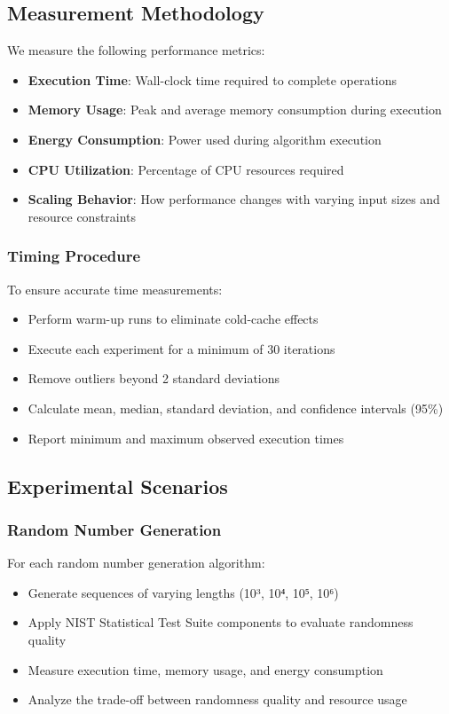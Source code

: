 \subsection{Measurement Methodology}
We measure the following performance metrics:
\begin{itemize}
    \item \textbf{Execution Time}: Wall-clock time required to complete operations
    \item \textbf{Memory Usage}: Peak and average memory consumption during execution
    \item \textbf{Energy Consumption}: Power used during algorithm execution
    \item \textbf{CPU Utilization}: Percentage of CPU resources required
    \item \textbf{Scaling Behavior}: How performance changes with varying input sizes and resource constraints
\end{itemize}

\subsubsection{Timing Procedure}
To ensure accurate time measurements:
\begin{itemize}
    \item Perform warm-up runs to eliminate cold-cache effects
    \item Execute each experiment for a minimum of 30 iterations
    \item Remove outliers beyond 2 standard deviations
    \item Calculate mean, median, standard deviation, and confidence intervals (95\%)
    \item Report minimum and maximum observed execution times
\end{itemize}

\subsection{Experimental Scenarios}
\subsubsection{Random Number Generation}
For each random number generation algorithm:
\begin{itemize}
    \item Generate sequences of varying lengths (10³, 10⁴, 10⁵, 10⁶)
    \item Apply NIST Statistical Test Suite components \cite{nist_test_suite} to evaluate randomness quality
    \item Measure execution time, memory usage, and energy consumption
    \item Analyze the trade-off between randomness quality and resource usage
\end{itemize}

